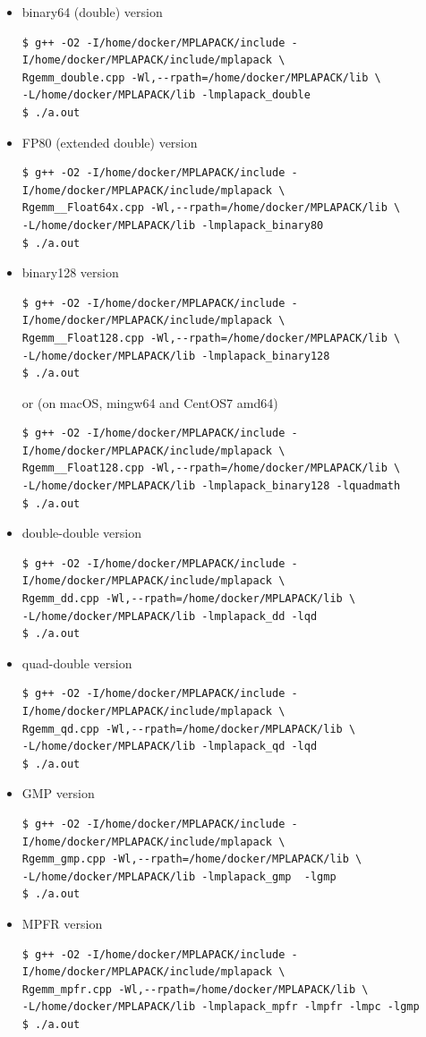 \documentclass[12pt]{article}
\begin{document}
\begin{itemize}
    \item binary64 (double) version
\begin{verbatim}
$ g++ -O2 -I/home/docker/MPLAPACK/include -I/home/docker/MPLAPACK/include/mplapack \
Rgemm_double.cpp -Wl,--rpath=/home/docker/MPLAPACK/lib \
-L/home/docker/MPLAPACK/lib -lmplapack_double
$ ./a.out
\end{verbatim}
\item FP80 (extended double) version
\begin{verbatim}
$ g++ -O2 -I/home/docker/MPLAPACK/include -I/home/docker/MPLAPACK/include/mplapack \
Rgemm__Float64x.cpp -Wl,--rpath=/home/docker/MPLAPACK/lib \
-L/home/docker/MPLAPACK/lib -lmplapack_binary80
$ ./a.out
\end{verbatim}
\item binary128 version
\begin{verbatim}
$ g++ -O2 -I/home/docker/MPLAPACK/include -I/home/docker/MPLAPACK/include/mplapack \
Rgemm__Float128.cpp -Wl,--rpath=/home/docker/MPLAPACK/lib \
-L/home/docker/MPLAPACK/lib -lmplapack_binary128
$ ./a.out
\end{verbatim}
or (on macOS, mingw64 and CentOS7 amd64)
\begin{verbatim}
$ g++ -O2 -I/home/docker/MPLAPACK/include -I/home/docker/MPLAPACK/include/mplapack \
Rgemm__Float128.cpp -Wl,--rpath=/home/docker/MPLAPACK/lib \
-L/home/docker/MPLAPACK/lib -lmplapack_binary128 -lquadmath
$ ./a.out
\end{verbatim}
\item double-double version
\begin{verbatim}
$ g++ -O2 -I/home/docker/MPLAPACK/include -I/home/docker/MPLAPACK/include/mplapack \
Rgemm_dd.cpp -Wl,--rpath=/home/docker/MPLAPACK/lib \
-L/home/docker/MPLAPACK/lib -lmplapack_dd -lqd
$ ./a.out
\end{verbatim}
\item quad-double version
\begin{verbatim}
$ g++ -O2 -I/home/docker/MPLAPACK/include -I/home/docker/MPLAPACK/include/mplapack \
Rgemm_qd.cpp -Wl,--rpath=/home/docker/MPLAPACK/lib \
-L/home/docker/MPLAPACK/lib -lmplapack_qd -lqd
$ ./a.out
\end{verbatim}
\item GMP version
\begin{verbatim}
$ g++ -O2 -I/home/docker/MPLAPACK/include -I/home/docker/MPLAPACK/include/mplapack \
Rgemm_gmp.cpp -Wl,--rpath=/home/docker/MPLAPACK/lib \
-L/home/docker/MPLAPACK/lib -lmplapack_gmp  -lgmp
$ ./a.out
\end{verbatim}
\item MPFR version
\begin{verbatim}
$ g++ -O2 -I/home/docker/MPLAPACK/include -I/home/docker/MPLAPACK/include/mplapack \
Rgemm_mpfr.cpp -Wl,--rpath=/home/docker/MPLAPACK/lib \
-L/home/docker/MPLAPACK/lib -lmplapack_mpfr -lmpfr -lmpc -lgmp
$ ./a.out
\end{verbatim}
\end{itemize}
\end{document}
